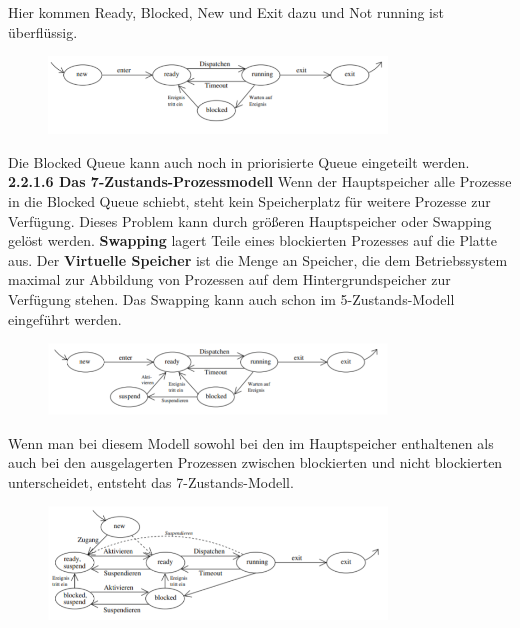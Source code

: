\documentclass{article}
\begin{document}
    Hier kommen Ready, Blocked, New und Exit dazu und Not running ist überflüssig.
    \begin{figure}[h]
        \centering
	    \includegraphics[width=90mm]{Skizzen/2_Kapitel/5-Zustandsmodell.png}
    \end{figure}
    Die Blocked Queue kann auch noch in priorisierte Queue eingeteilt werden.\newline
    \\
    \textbf{2.2.1.6 Das 7-Zustands-Prozessmodell}\newline
    Wenn der Hauptspeicher alle Prozesse in die Blocked Queue schiebt, steht kein Speicherplatz für weitere Prozesse zur Verfügung. Dieses Problem kann durch größeren Hauptspeicher oder Swapping gelöst werden.\newline
    \textbf{Swapping} lagert Teile eines blockierten Prozesses auf die Platte aus.\newline
    Der \textbf{Virtuelle Speicher} ist die Menge an Speicher, die dem Betriebssystem maximal zur Abbildung von Prozessen auf dem Hintergrundspeicher zur Verfügung stehen.\newline
    Das Swapping kann auch schon im 5-Zustands-Modell eingeführt werden.
    \begin{figure}[h]
        \centering
	    \includegraphics[width=90mm]{Skizzen/2_Kapitel/5-Zustandsmodell-mit-Suspend.png}
    \end{figure}
    Wenn man bei diesem Modell sowohl bei den im Hauptspeicher enthaltenen als auch bei den ausgelagerten Prozessen zwischen blockierten und nicht blockierten unterscheidet, entsteht das 7-Zustands-Modell.
    \begin{figure}[h]
        \centering
	    \includegraphics[width=90mm]{Skizzen/2_Kapitel/7-Zustandsmodell.png}
    \end{figure}
\end{document}
